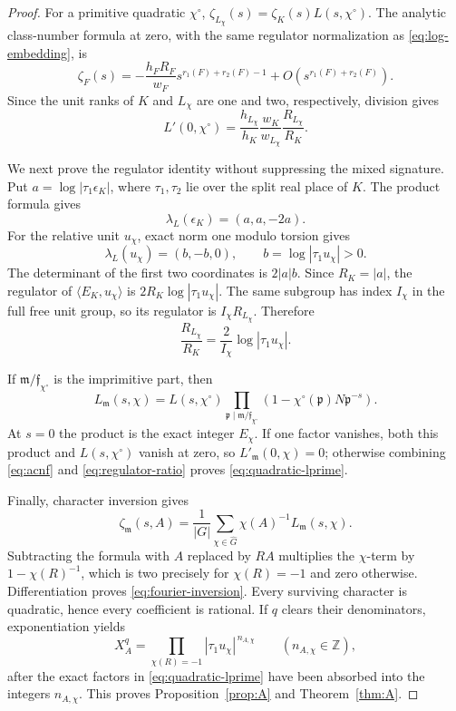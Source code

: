 \documentclass[11pt]{article}
\newcommand{\Z}{\mathbb Z}
\begin{document}
\begin{proof}
For a primitive quadratic \(\chi^\circ\),
\(\zeta_{L_\chi}(s)=\zeta_K(s)L(s,\chi^\circ)\).
The analytic class-number formula at zero, with the same regulator
normalization as \eqref{eq:log-embedding}, is
\[
 \zeta_F(s)=
 -\frac{h_FR_F}{w_F}s^{r_1(F)+r_2(F)-1}
 +O\!\left(s^{r_1(F)+r_2(F)}\right).
\]
Since the unit ranks of \(K\) and \(L_\chi\) are one and two,
respectively, division gives
\begin{equation}\label{eq:acnf}
 L'(0,\chi^\circ)=
 \frac{h_{L_\chi}}{h_K}\frac{w_K}{w_{L_\chi}}
 \frac{R_{L_\chi}}{R_K}.
\end{equation}

We next prove the regulator identity without suppressing the mixed
signature.  Put \(a=\log|\tau_1\epsilon_K|\), where
\(\tau_1,\tau_2\) lie over the split real place of \(K\).  The
product formula gives
\[
 \lambda_L(\epsilon_K)=(a,a,-2a).
\]
For the relative unit \(u_\chi\), exact norm one modulo torsion gives
\[
 \lambda_L(u_\chi)=(b,-b,0),\qquad
 b=\log|\tau_1u_\chi|>0.
\]
The determinant of the first two coordinates is \(2|a|b\).
Since \(R_K=|a|\), the regulator of
\(\langle E_K,u_\chi\rangle\) is \(2R_K\log|\tau_1u_\chi|\).
The same subgroup has index \(I_\chi\) in the full free unit group,
so its regulator is \(I_\chi R_{L_\chi}\).  Therefore
\begin{equation}\label{eq:regulator-ratio}
 \frac{R_{L_\chi}}{R_K}
 =\frac{2}{I_\chi}\log|\tau_1u_\chi|.
\end{equation}

If \(\mathfrak m/\mathfrak f_{\chi^\circ}\) is the imprimitive part,
then
\[
 L_{\mathfrak m}(s,\chi)
 =L(s,\chi^\circ)
  \prod_{\mathfrak p\mid
    \mathfrak m/\mathfrak f_{\chi^\circ}}
  \left(1-\chi^\circ(\mathfrak p)N\mathfrak p^{-s}\right).
\]
At \(s=0\) the product is the exact integer \(E_\chi\).  If one
factor vanishes, both this product and \(L(s,\chi^\circ)\) vanish at
zero, so \(L'_{\mathfrak m}(0,\chi)=0\); otherwise combining
\eqref{eq:acnf} and \eqref{eq:regulator-ratio} proves
\eqref{eq:quadratic-lprime}.

Finally, character inversion gives
\[
 \zeta_{\mathfrak m}(s,A)
 =\frac1{|G|}\sum_{\chi\in\widehat G}
       \chi(A)^{-1}L_{\mathfrak m}(s,\chi).
\]
Subtracting the formula with \(A\) replaced by \(RA\) multiplies the
\(\chi\)-term by \(1-\chi(R)^{-1}\), which is two precisely for
\(\chi(R)=-1\) and zero otherwise.  Differentiation proves
\eqref{eq:fourier-inversion}.
Every surviving character is quadratic, hence every coefficient is
rational.  If \(q\) clears their denominators, exponentiation yields
\begin{equation}\label{eq:quadratic-power}
 X_A^q=\prod_{\chi(R)=-1}
        |\tau_1u_\chi|^{\,n_{A,\chi}}
 \qquad(n_{A,\chi}\in\Z),
\end{equation}
after the exact factors in \eqref{eq:quadratic-lprime} have been
absorbed into the integers
\(n_{A,\chi}\).  This proves Proposition~\ref{prop:A} and
Theorem~\ref{thm:A}.
\end{proof}
\end{document}

